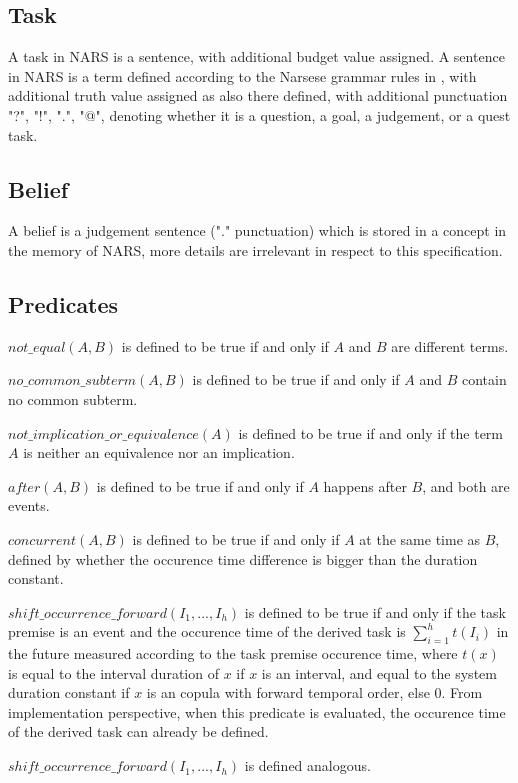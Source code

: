 \documentclass{article}
\begin{document}
\subsection{Task}
A task in NARS is a sentence, with additional budget value assigned.
A sentence in NARS is a term defined according to the Narsese grammar rules in \cite{wp:book2}, with additional truth value assigned as also there defined,
with additional punctuation "?", "!", ".", "@", denoting whether it is a question, a goal, a judgement, or a quest task.

\subsection{Belief}
A belief is a judgement sentence ("." punctuation) which is stored in a concept in the memory of NARS, more details are irrelevant in respect to this specification.

\subsection{Predicates}
$not\_equal(A,B)$ is defined to be true if and only if $A$ and $B$ are different terms.

$no\_common\_subterm(A,B)$ is defined to be true if and only if $A$ and $B$ contain no common subterm.

$not\_implication\_or\_equivalence(A)$ is defined to be true if and only if the term $A$ is neither an equivalence nor an implication.

$after(A,B)$ is defined to be true if and only if $A$ happens after $B$, and both are events.

$concurrent(A,B)$ is defined to be true if and only if $A$ at the same time as $B$, defined by whether the occurence time difference is bigger than the duration constant.

$shift\_occurrence\_forward(I_1,...,I_h)$ is defined to be true if and only if the task premise is an event and the occurence time of the derived task is $\sum_{i=1}^{h} t(I_i)$ in the future measured according to the task premise occurence time, where $t(x)$ is equal to the interval duration of $x$ if $x$ is an interval, and equal to the system duration constant if $x$ is an copula with forward temporal order, else $0$. From implementation perspective, when this predicate is evaluated, the occurence time of the derived task can already be defined.

$shift\_occurrence\_forward(I_1,...,I_h)$ is defined analogous.
\end{document}
